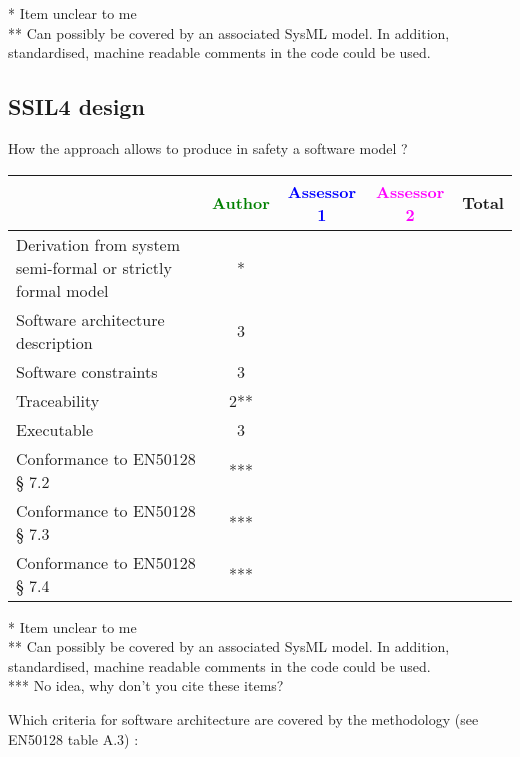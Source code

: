 \begin{author_comment}
* Item unclear to me\\
** Can possibly be covered by an associated SysML model. In addition, standardised, machine readable comments in the code could be used.\\
\end{author_comment}

\subsection{SSIL4 design}

How the approach allows to  produce in safety a software model ?

\begin{tabular}{|l | c | c | c | c|}
\hline
& \textcolor{green}{Author} & \textcolor{blue}{Assessor 1} & \textcolor{magenta}{Assessor 2} & Total \\
\hline
Derivation from system semi-formal or strictly formal model  &* & & &  \\
\hline 
Software architecture description  &3 & & &  \\
\hline
Software constraints  &3 & & &  \\
\hline
Traceability  &2** & & &  \\
\hline
Executable  &3 & & &  \\
\hline
Conformance to EN50128 § 7.2  &*** & & &  \\
\hline
Conformance to EN50128 § 7.3  &*** & & &  \\
\hline
Conformance to EN50128 § 7.4  &*** & & &  \\
\hline
\end{tabular}

\begin{author_comment}
* Item unclear to me\\
** Can possibly be covered by an associated SysML model. In addition, standardised, machine readable comments in the code could be used.\\
*** No idea, why don't you cite these items?
\end{author_comment}

Which criteria for software architecture are covered by the methodology
(see EN50128 table A.3) :

